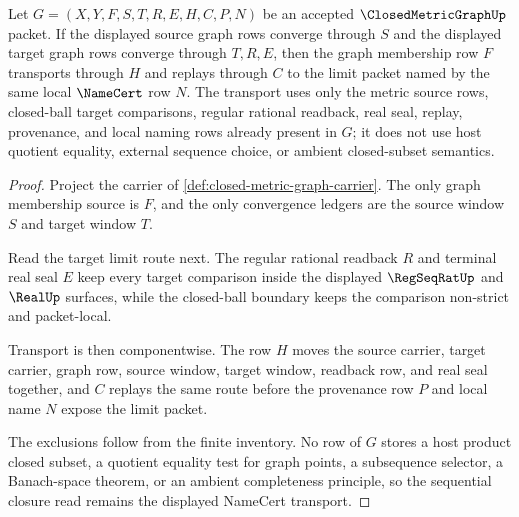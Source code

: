 \begin{theorem}
\label{thm:closed-metric-graph-sequential-closure}
Let $G=(X,Y,F,S,T,R,E,H,C,P,N)$ be an accepted $\ClosedMetricGraphUp$ packet. If the displayed source graph rows converge through $S$ and the displayed target graph rows converge through $T,R,E$, then the graph membership row $F$ transports through $H$ and replays through $C$ to the limit packet named by the same local $\NameCert$ row $N$. The transport uses only the metric source rows, closed-ball target comparisons, regular rational readback, real seal, replay, provenance, and local naming rows already present in $G$; it does not use host quotient equality, external sequence choice, or ambient closed-subset semantics.
\end{theorem}
\begin{proof}
Project the carrier of \autoref{def:closed-metric-graph-carrier}. The only graph membership source is $F$, and the only convergence ledgers are the source window $S$ and target window $T$.

Read the target limit route next. The regular rational readback $R$ and terminal real seal $E$ keep every target comparison inside the displayed $\RegSeqRatUp$ and $\RealUp$ surfaces, while the closed-ball boundary keeps the comparison non-strict and packet-local.

Transport is then componentwise. The row $H$ moves the source carrier, target carrier, graph row, source window, target window, readback row, and real seal together, and $C$ replays the same route before the provenance row $P$ and local name $N$ expose the limit packet.

The exclusions follow from the finite inventory. No row of $G$ stores a host product closed subset, a quotient equality test for graph points, a subsequence selector, a Banach-space theorem, or an ambient completeness principle, so the sequential closure read remains the displayed NameCert transport.
\end{proof}


